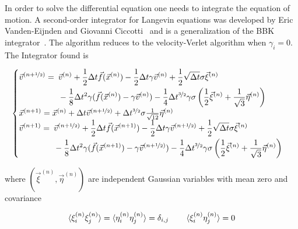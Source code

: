 \documentclass[a4paper]{article}
\begin{document}
In order to solve the differential equation one needs to integrate the equation of motion. A second-order integrator for Langevin equations was developed by Eric Vanden-Eijnden and Giovanni Ciccotti~\cite{EricVanden-Eijnden2006} and is a generalization of the BBK integrator~\cite{BrungerA.1984}. The algorithm reduces to the velocity-Verlet algorithm when $\gamma_i = 0$. The Integrator found is

\begin{equation}
\begin{cases}
\begin{aligned}[t]\arraycolsep=0pt
\vec{v}^{(n+\nicefrac{1}{2})} = \enspace &  \vec{v}^{(n)} + \frac{1}{2} \Delta t \vec{f}(\vec{x}^{(n)}) - \frac{1}{2} \Delta t \gamma \vec{v}^{(n)} + \frac{1}{2} \sqrt{\Delta t} \sigma \vec{\xi}^{(n)} \\ &
- \frac{1}{8} \Delta t^2 \gamma (\vec{f}(\vec{x}^{(n)}) - \gamma \vec{v}^{(n)}) - \frac{1}{4} \Delta t^{\nicefrac{3}{2}} \gamma \sigma \left(\frac{1}{2} \vec{\xi}^{(n)} + \frac{1}{\sqrt{3}} \vec{\eta}^{(n)}\right)
\end{aligned} \\
\vec{x}^{(n+1)} = \vec{x}^{(n)} + \Delta t \vec{v}^{(n + \nicefrac{1}{2})} + \Delta t^{\nicefrac{3}{2}} \sigma \frac{1}{\sqrt{12}} \vec{\eta}^{(n)} \\
\begin{aligned}[t]\arraycolsep=0pt
\vec{v}^{(n+1)} = \enspace &  \vec{v}^{(n + \nicefrac{1}{2})} + \frac{1}{2} \Delta t \vec{f}(\vec{x}^{(n+1)}) - \frac{1}{2} \Delta t \gamma \vec{v}^{(n + \nicefrac{1}{2})} + \frac{1}{2} \sqrt{\Delta t} \sigma \vec{\xi}^{(n)} \\ &
- \frac{1}{8} \Delta t^2 \gamma (\vec{f}(\vec{x}^{(n+1)}) - \gamma \vec{v}^{(n + \nicefrac{1}{2})}) - \frac{1}{4} \Delta t^{\nicefrac{3}{2}} \gamma \sigma \left(\frac{1}{2} \vec{\xi}^{(n)} + \frac{1}{\sqrt{3}} \vec{\eta}^{(n)}\right)
\end{aligned} 
\end{cases}
\label{eq:final_integrator}
\end{equation}

where $(\vec{\xi}^{(n)}, \vec{\eta}^{(n)})$ are independent Gaussian variables with mean zero and covariance

\begin{equation}
\braket{\xi_i^{(n)} \xi_j^{(n)}} = \braket{\eta_i^{(n)} \eta_j^{(n)}} = \delta_{i,j} \qquad \braket{\xi_i^{(n)} \eta_j^{(n)}} = 0
\end{equation}
\end{document}
